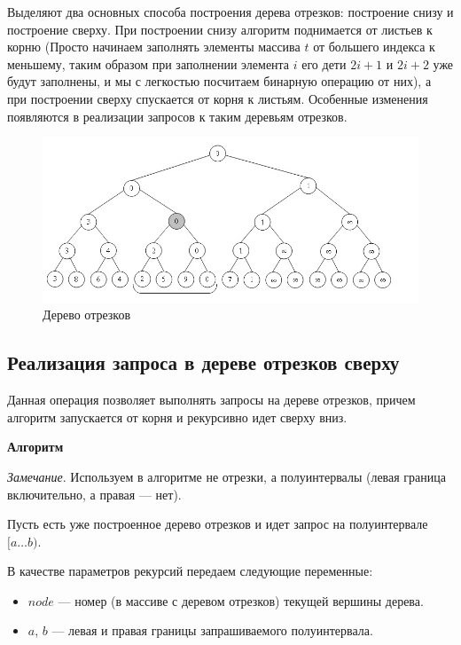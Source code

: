 Выделяют два основных способа построения дерева отрезков: построение снизу и построение сверху.
При построении снизу алгоритм поднимается от листьев к корню
(Просто начинаем заполнять элементы массива $t$ от большего индекса к меньшему, таким образом при заполнении элемента $i$ его дети
$2i+1$ и $2i+2$ уже будут заполнены, и мы с легкостью посчитаем бинарную операцию от них),
а при построении сверху спускается от корня к листьям.
Особенные изменения появляются в реализации запросов к таким деревьям отрезков.

\begin{figure}
\centering
\includegraphics[scale=0.5]{images/SegmentTree.jpg}
\caption{Дерево отрезков}
\label{fig:segment_tree}
\end{figure}

\subsection{Реализация запроса в дереве отрезков сверху}

Данная операция позволяет выполнять запросы на дереве отрезков, причем алгоритм запускается от корня и рекурсивно идет сверху вниз.

\textbf{Алгоритм}

\textit{Замечание}. Используем в алгоритме не отрезки, а полуинтервалы (левая граница включительно, а правая — нет).

Пусть есть уже построенное дерево отрезков и идет запрос на полуинтервале $[a \ldots b)$.

В качестве параметров рекурсий передаем следующие переменные:
\begin{itemize}
    \item $node$ — номер (в массиве с деревом отрезков) текущей вершины дерева.
    \item $a$, $b$ — левая и правая границы запрашиваемого полуинтервала.
\end{itemize}

